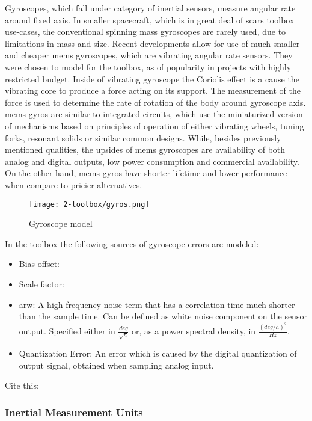         Gyroscopes, which fall under category of inertial sensors, measure angular rate around fixed axis. In smaller spacecraft, which is in great deal of \ac{scars} toolbox use-cases, the conventional spinning mass gyroscopes are rarely used, due to limitations in mass and size. Recent developments allow for use of much smaller and cheaper \ac{mems} gyroscopes, which are vibrating angular rate sensors. They were chosen to model for the toolbox, as of popularity in projects with highly restricted budget. \cite{armenise2010advances} Inside of vibrating gyroscope the Coriolis effect is a cause the vibrating core to produce a force acting on its support. The measurement of the force is used to determine the rate of rotation of the body around gyroscope axis. \ac{mems} gyros are similar to integrated circuits, which use the miniaturized version of mechanisms based on principles of operation of either vibrating wheels, tuning forks, resonant solids or similar common designs. \cite{bernstein2003overview} While, besides previously mentioned qualities, the upsides of \ac{mems} gyroscopes are availability of both analog and digital outputs, low power consumption and commercial availability. On the other hand, \ac{mems} gyros have shorter lifetime and lower performance when compare to pricier alternatives.

        \begin{figure}[H]
            \centering
            \texttt{[image: 2-toolbox/gyros.png]}
            \caption{Gyroscope model}
            \label{fig:gryo_simulink}
        \end{figure}

        In the toolbox the following sources of gyroscope errors are modeled:
        \begin{itemize}
            \item Bias offset:
            \item Scale factor: 
            \item \ac{arw}: A high frequency noise term that has a correlation time much shorter than the sample time. Can be defined as white noise component on the sensor output. Specified either in $\frac{deg}{\sqrt{h}}$ or, as a power spectral density, in $\frac{(deg/h)^2}{Hz}$. %
            \item Quantization Error: An error which is caused by the digital quantization of output signal, obtained when sampling analog input.
        \end{itemize}

        Cite this: \cite{kapeelmodeling} %



    \subsubsection{Inertial Measurement Units}

